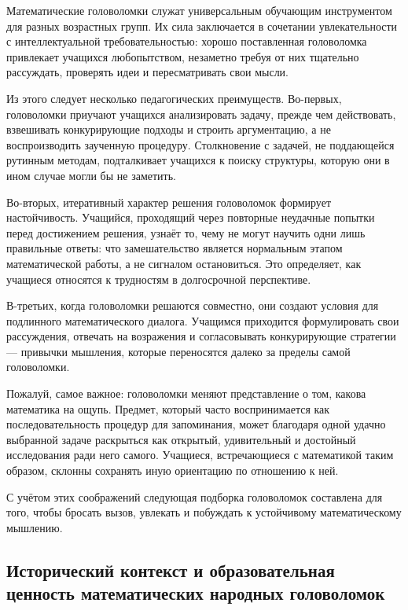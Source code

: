 \documentclass[a4paper,14pt]{extreport}
\theoremstyle{plain}
\theoremstyle{definition}
\theoremstyle{remark}
\begin{document}
Математические головоломки служат универсальным обучающим инструментом для разных возрастных групп. Их сила заключается в сочетании увлекательности с интеллектуальной требовательностью: хорошо поставленная головоломка привлекает учащихся любопытством, незаметно требуя от них тщательно рассуждать, проверять идеи и пересматривать свои мысли.

Из этого следует несколько педагогических преимуществ. Во-первых, головоломки приучают учащихся анализировать задачу, прежде чем действовать, взвешивать конкурирующие подходы и строить аргументацию, а не воспроизводить заученную процедуру. 
Столкновение с задачей, не поддающейся рутинным методам, подталкивает учащихся к поиску структуры, которую они в ином случае могли бы не заметить.

Во-вторых, итеративный характер решения головоломок формирует настойчивость. Учащийся, проходящий через повторные неудачные попытки перед достижением решения, узнаёт то, чему не могут научить одни лишь правильные ответы: что замешательство является нормальным этапом математической работы, а не сигналом остановиться. Это определяет, как учащиеся относятся к трудностям в долгосрочной перспективе.

В-третьих, когда головоломки решаются совместно, они создают условия для подлинного математического диалога. Учащимся приходится формулировать свои рассуждения, отвечать на возражения и согласовывать конкурирующие стратегии --- привычки мышления, которые переносятся далеко за пределы самой головоломки.

Пожалуй, самое важное: головоломки меняют представление о том, какова математика на ощупь. Предмет, который часто воспринимается как последовательность процедур для запоминания, может благодаря одной удачно выбранной задаче раскрыться как открытый, удивительный и достойный исследования ради него самого. Учащиеся, встречающиеся с математикой таким образом, склонны сохранять иную ориентацию по отношению к ней.

С учётом этих соображений следующая подборка головоломок составлена для того, чтобы бросать вызов, увлекать и побуждать к устойчивому математическому мышлению.
\subsection{Исторический контекст и образовательная ценность математических народных головоломок}~\label{sec4.1.1}
\end{document}
